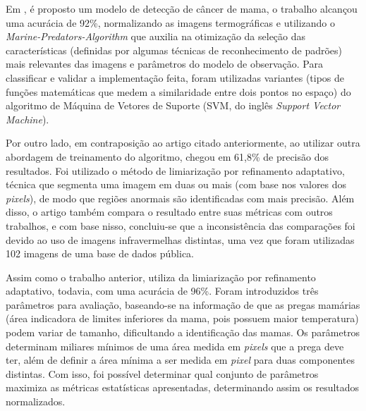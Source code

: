 Em , é proposto um modelo de detecção de câncer de mama, o trabalho alcançou uma acurácia de 92\%, normalizando as imagens termográficas e utilizando o \textit{Marine-Predators-Algorithm} que auxilia na otimização da seleção das características (definidas por algumas técnicas de reconhecimento de padrões) mais relevantes das imagens e parâmetros do modelo de observação. Para classificar e validar a implementação feita, foram utilizadas variantes (tipos de funções matemáticas que medem a similaridade entre dois pontos no espaço) do algoritmo de Máquina de Vetores de Suporte (SVM, do inglês \textit{Support Vector Machine}).

Por outro lado, em contraposição ao artigo citado anteriormente,  ao utilizar outra abordagem de treinamento do algoritmo, chegou em 61,8\% de precisão dos resultados. Foi utilizado o método de limiarização por refinamento adaptativo, técnica que segmenta uma imagem em duas ou mais (com base nos valores dos \textit{pixels}), de modo que regiões anormais são identificadas com mais precisão. Além disso, o artigo também compara o resultado entre suas métricas com outros trabalhos, e com base nisso, concluiu-se que a inconsistência das comparações foi devido ao uso de imagens infravermelhas distintas, uma vez que foram utilizadas 102 imagens de uma base de dados pública.

Assim como o trabalho anterior,  utiliza da limiarização por refinamento adaptativo, todavia, com uma acurácia de 96\%. Foram introduzidos três parâmetros para avaliação, baseando-se na informação de que as pregas mamárias (área indicadora de limites inferiores da mama, pois possuem maior temperatura) podem variar de tamanho, dificultando a identificação das mamas. Os parâmetros determinam miliares mínimos de uma área medida em \textit{pixels} que a prega deve ter, além de definir a área mínima a ser medida em \textit{pixel} para duas componentes distintas. Com isso, foi possível determinar qual conjunto de parâmetros maximiza as métricas estatísticas apresentadas, determinando assim os resultados normalizados.

